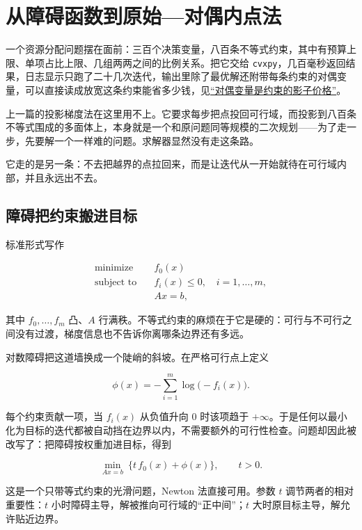\section{从障碍函数到原始---对偶内点法}
\label{sec:09-Convex-Optimization/06-Optimization-Algorithms/05}

一个资源分配问题摆在面前：三百个决策变量，八百条不等式约束，其中有预算上限、单项占比上限、几组两两之间的比例关系。把它交给 \texttt{cvxpy}，几百毫秒返回结果，日志显示只跑了二十几次迭代，输出里除了最优解还附带每条约束的对偶变量，可以直接读成放宽这条约束能省多少钱，见\hyperref[sec:09-Convex-Optimization/05-Duality/04]{``对偶变量是约束的影子价格''}。

上一篇的投影梯度法在这里用不上。它要求每步把点投回可行域，而投影到八百条不等式围成的多面体上，本身就是一个和原问题同等规模的二次规划——为了走一步，先要解一个一样难的问题。求解器显然没有走这条路。

它走的是另一条：不去把越界的点拉回来，而是让迭代从一开始就待在可行域内部，并且永远出不去。

\subsection{障碍把约束搬进目标}

标准形式写作

\[
\begin{aligned}
\text{minimize}\quad &f_0(x)\\
\text{subject to}\quad &f_i(x)\le0,\quad i=1,\ldots,m,\\
&Ax=b,
\end{aligned}
\]

其中 \(f_0,\ldots,f_m\) 凸、\(A\) 行满秩。不等式约束的麻烦在于它是硬的：可行与不可行之间没有过渡，梯度信息也不告诉你离哪条边界还有多远。

对数障碍把这道墙换成一个陡峭的斜坡。在严格可行点上定义

\[
\phi(x)=-\sum_{i=1}^m\log\bigl(-f_i(x)\bigr).
\]

每个约束贡献一项，当 \(f_i(x)\) 从负值升向 \(0\) 时该项趋于 \(+\infty\)。于是任何以最小化为目标的迭代都被自动挡在边界以内，不需要额外的可行性检查。问题却因此被改写了：把障碍按权重加进目标，得到

\[
\min_{Ax=b}\ \bigl\{t\,f_0(x)+\phi(x)\bigr\},\qquad t>0 .
\]

这是一个只带等式约束的光滑问题，Newton 法直接可用。参数 \(t\) 调节两者的相对重要性：\(t\) 小时障碍主导，解被推向可行域的``正中间''；\(t\) 大时原目标主导，解允许贴近边界。


